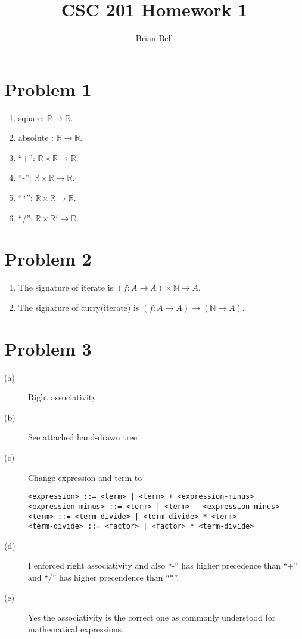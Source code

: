 \documentclass[11pt]{article}
\begin{document}
\title{CSC 201 Homework 1}
\author{Brian Bell\\
}
\renewcommand{\today}{February 8, 2009}
\maketitle

\section*{Problem 1}
\begin{enumerate}
\item square: $\mathbb{R} \rightarrow \mathbb{R}$.
\item absolute : $\mathbb{R} \rightarrow \mathbb{R}$.
\item ``+'': $\mathbb{R} \times \mathbb{R} \rightarrow \mathbb{R}$.
\item ``-'': $\mathbb{R} \times \mathbb{R} \rightarrow \mathbb{R}$.
\item ``*'': $\mathbb{R} \times \mathbb{R} \rightarrow \mathbb{R}$.
\item ``/'': $\mathbb{R} \times \mathbb{R'} \rightarrow \mathbb{R}$.
  
\end{enumerate}

\section*{Problem 2}
\begin{enumerate}
\item The signature of iterate is $(f:A \rightarrow A) \times \mathbb{N} \rightarrow A.$
\item The signature of curry(iterate) is $(f: A \rightarrow A) \rightarrow (\mathbb{N} \rightarrow A).$
\end{enumerate}
\section*{Problem 3}
\begin{description}
\item[(a)] Right associativity
\item[(b)] See attached hand-drawn tree
\item[(c)] Change expression and term to \newline \newline
\begin{center}
\begin{verbatim}
<expression> ::= <term> | <term> + <expression-minus>
<expression-minus> ::= <term> | <term> - <expression-minus>
<term> ::= <term-divide> | <term-divide> * <term>
<term-divide> ::= <factor> | <factor> * <term-divide>
\end{verbatim}
\end{center}
\item[(d)] I enforced right associativity and also ``-'' has higher precedence than ``+'' and ``/'' has higher precendence than ``*''.
\item[(e)] Yes the associativity is the correct one as commonly understood for mathematical expressions.
\end{description}
\end{document}
